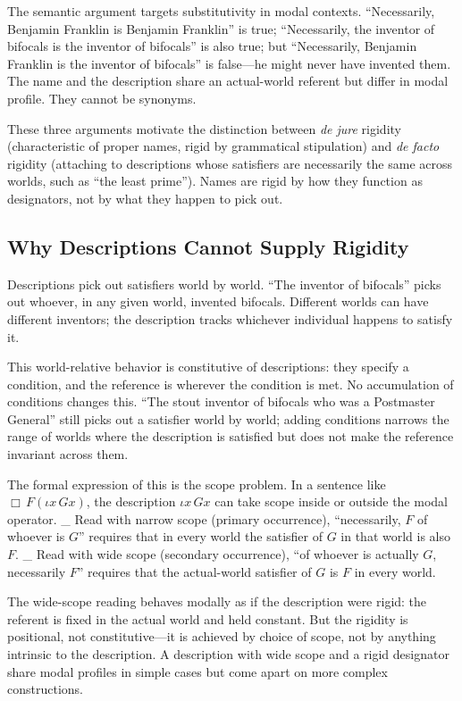 \documentclass[10pt]{article}
\begin{document}
The semantic argument targets substitutivity in modal contexts. ``Necessarily, Benjamin Franklin is Benjamin Franklin'' is true; ``Necessarily, the inventor of bifocals is the inventor of bifocals'' is also true; but ``Necessarily, Benjamin Franklin is the inventor of bifocals'' is false---he might never have invented them. The name and the description share an actual-world referent but differ in modal profile. They cannot be synonyms.

These three arguments motivate the distinction between \emph{de jure} rigidity (characteristic of proper names, rigid by grammatical stipulation) and \emph{de facto} rigidity (attaching to descriptions whose satisfiers are necessarily the same across worlds, such as ``the least prime''). Names are rigid by how they function as designators, not by what they happen to pick out.

\subsection{Why Descriptions Cannot Supply Rigidity}\label{why-descriptions-cannot-supply-rigidity}

Descriptions pick out satisfiers world by world. ``The inventor of bifocals'' picks out whoever, in any given world, invented bifocals. Different worlds can have different inventors; the description tracks whichever individual happens to satisfy it.

This world-relative behavior is constitutive of descriptions: they specify a condition, and the reference is wherever the condition is met. No accumulation of conditions changes this. ``The stout inventor of bifocals who was a Postmaster General'' still picks out a satisfier world by world; adding conditions narrows the range of worlds where the description is satisfied but does not make the reference invariant across them.

The formal expression of this is the scope problem. In a sentence like \(\Box \, F(\iota x\, G x)\), the description \(\iota x\, G x\) can take scope inside or outside the modal operator. \_ Read with narrow scope (primary occurrence), ``necessarily, \(F\) of whoever is \(G\)'' requires that in every world the satisfier of \(G\) in that world is also \(F\). \_ Read with wide scope (secondary occurrence), ``of whoever is actually \(G\), necessarily \(F\)'' requires that the actual-world satisfier of \(G\) is \(F\) in every world.

The wide-scope reading behaves modally as if the description were rigid: the referent is fixed in the actual world and held constant. But the rigidity is positional, not constitutive---it is achieved by choice of scope, not by anything intrinsic to the description. A description with wide scope and a rigid designator share modal profiles in simple cases but come apart on more complex constructions.
\end{document}
